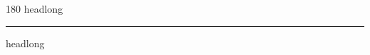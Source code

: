 
\begin{frame}
\begin{center}
\begin{turn}{180}
{\fontsize{2.5cm}{1em}\selectfont headlong}
\end{turn}
\vspace{1em}\par  
\hrule
\vspace{1em}\par  
{\fontsize{2.5cm}{1em}\selectfont headlong}
\end{center}
\end{frame}
